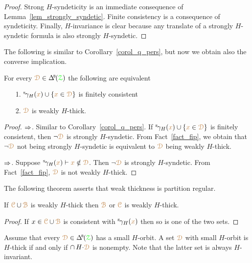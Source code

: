 \begin{proof}
  Strong $H$-syndeticity is an immediate consequence of Lemma~\ref{lem_strongly_syndetic}.
  Finite consistency is a consequence of syndeticity.
  Finally, $H$-invariance is clear because any translate of a strongly $H$-syndetic formula is also strongly $H$-syndetic.
\end{proof}

The following is similar to Corollary~\ref{corol_q_pers}, but now we obtain also the converse implication.

\begin{corollary}\label{corol_q_w_pers}
  For every $\mrD\in\BDelta(\grZ)$ the following are equivalent
  \begin{itemize}
    \item [1.] ${}^{\rm s}\kern-.2ex\gamma_H({\color{brown} x})\cup\{{\color{brown} x}\in{\color{brown}\EuScript D}\}$ is finitely consistent
    \item [2.] ${\color{brown}\EuScript D}$ is weakly $H$-thick.
  \end{itemize}
\end{corollary}

\begin{proof}
  $\Rightarrow$. 
  Similar to Corollary~\ref{corol_q_pers}.
  If ${}^{\rm s}\kern-.2ex\gamma_H({\color{brown} x})\cup\{{\color{brown} x}\in{\color{brown}\EuScript D}\}$ is finitely consistent, then $\neg{\color{brown}\EuScript D}$ is strongly $H$-syndetic.
  From Fact~\ref{fact_fip}, we obtain that $\neg{\color{brown}\EuScript D}$ not being strongly $H$-syndetic is equivalent to ${\color{brown}\EuScript D}$ being weakly $H$-thick.

  $\Rightarrow$.
  Suppose ${}^{\rm s}\kern-.2ex\gamma_H({\color{brown} x})\vdash{\color{brown}x}\notin{\color{brown}\EuScript D}$.
  Then $\neg{\color{brown}\EuScript D}$ is strongly $H$-syndetic.
  From Fact~\ref{fact_fip}, ${\color{brown}\EuScript D}$ is not weakly $H$-thick.
\end{proof}

The following theorem asserts that weak thickness is partition regular.

\begin{theorem}\label{thm_wt_partreg}
  If ${\color{brown}\EuScript C}\cup{\color{brown}\EuScript B}$ is weakly $H$-thick then ${\color{brown}\EuScript B}$ or ${\color{brown}\EuScript C}$ is weakly $H$-thick.
\end{theorem}

\begin{proof}
  If $x\in {\color{brown}\EuScript C}\cup{\color{brown}\EuScript B}$ is consistent with ${}^{\rm s}\kern-.2ex\gamma_H({\color{brown} x})$ then so is one of the two sets.
\end{proof}

Assume that every $\mrD\in\BDelta(\grZ)$ has a small $H$-orbit.
A set ${\color{brown}\EuScript D}$ with small $H$-orbit is $H$-thick if and only if $\cap\,H{\cdot}{\color{brown}\EuScript D}$ is nonempty.
Note that the latter set is always $H$-invariant.

